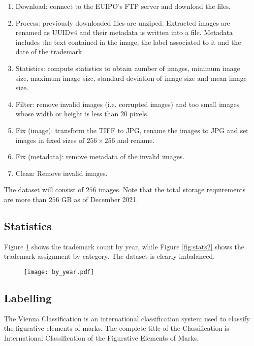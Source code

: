 \documentclass{article}
\begin{document}
\begin{enumerate}
    \item Download: connect to the EUIPO's FTP server and download the files.
    \item Process: previously downloaded files are unziped. Extracted images are renamed as UUIDv4 and their metadata is written into a file. Metadata includes the text contained in the image, the label associated to it and the date of the trademark.
    \item Statistics: compute statistics to obtain number of images, minimum image size, maximum image size, standard deviation of image size and mean image size.
    \item Filter: remove invalid images (i.e. corrupted images) and too small images whose width or height is less than 20 pixels.
    \item Fix (image): transform the TIFF to JPG, rename the images to JPG and set images in fixed sizes of $256 \times 256$ and rename.
    \item Fix (metadata): remove metadata of the invalid images.
    \item Clean: Remove invalid images.
\end{enumerate}

The dataset will consist of $256$ images. Note that the total storage requirements are more than $256$ GB as of December 2021.

\subsection{Statistics}

Figure \ref{fig:stats} shows the trademark count by year, while Figure \ref{fig:stats2} shows the trademark assignment by category. The dataset is clearly imbalanced.

\begin{figure}[t]
\texttt{[image: by\_year.pdf]}
\label{fig:stats}
\centering
\end{figure}





\subsection{Labelling}
The Vienna Classification is an international classification system used to classify the figurative elements of marks. The complete title of the Classification is International Classification of the Figurative Elements of Marks.
\end{document}
